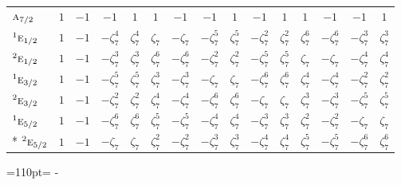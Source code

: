 \documentclass[10pt,a4paper]{article}
\makeatletter
\def\grouprule#1#2{\noalign{\marks\LTgroupmarks{\the\belowrulesep}\nobreak\vskip#1%
  \vskip\aboverulesep}\multispan\LT@cols\unskip{\leaders\hrule\@height#2\hfill\kern\z@}\cr
  \noalign{\penalty\LTrulebreak\vskip\belowrulesep\global\@lastruleclass\z@}}
\newcommand{\needspace}[1]{\par\penalty-100\begingroup\dimen0=#1\relax\dimen2=\pagegoal
  \advance\dimen2-\pagetotal\ifdim\dimen0>\dimen2\relax\ifdim\dimen2>0pt\vfil\break\fi\fi
  \endgroup}
\numberwithin{equation}{section}
\newcommand{\irr}[1]{\text{\normalfont\scshape #1}}
\newcommand{\conjpair}[1]{{}^{#1}}
\newcommand{\rootunity}[1]{\zeta_{#1}}
\makeatother
\begin{document}
{\begin{longtable}{@{}lcccccccccccccc@{}}
\grouprule{0pt}{\lightrulewidth}
$\irr{a}_{7/2}$ & $1$ & $-1$ & $-1$ & $1$ & $1$ & $-1$ & $-1$ & $1$ & $-1$ & $1$ & $1$ & $-1$ & $-1$ & $1$\\
$\conjpair{1}\irr{e}_{1/2}$ & $1$ & $-1$ & $-\rootunity{7}^{4}$ & $\rootunity{7}^{4}$ & $\rootunity{7}$ & $-\rootunity{7}$ & $-\rootunity{7}^{5}$ & $\rootunity{7}^{5}$ & $-\rootunity{7}^{2}$ & $\rootunity{7}^{2}$ & $\rootunity{7}^{6}$ & $-\rootunity{7}^{6}$ & $-\rootunity{7}^{3}$ & $\rootunity{7}^{3}$\\
$\conjpair{2}\irr{e}_{1/2}$ & $1$ & $-1$ & $-\rootunity{7}^{3}$ & $\rootunity{7}^{3}$ & $\rootunity{7}^{6}$ & $-\rootunity{7}^{6}$ & $-\rootunity{7}^{2}$ & $\rootunity{7}^{2}$ & $-\rootunity{7}^{5}$ & $\rootunity{7}^{5}$ & $\rootunity{7}$ & $-\rootunity{7}$ & $-\rootunity{7}^{4}$ & $\rootunity{7}^{4}$\\
$\conjpair{1}\irr{e}_{3/2}$ & $1$ & $-1$ & $-\rootunity{7}^{5}$ & $\rootunity{7}^{5}$ & $\rootunity{7}^{3}$ & $-\rootunity{7}^{3}$ & $-\rootunity{7}$ & $\rootunity{7}$ & $-\rootunity{7}^{6}$ & $\rootunity{7}^{6}$ & $\rootunity{7}^{4}$ & $-\rootunity{7}^{4}$ & $-\rootunity{7}^{2}$ & $\rootunity{7}^{2}$\\
$\conjpair{2}\irr{e}_{3/2}$ & $1$ & $-1$ & $-\rootunity{7}^{2}$ & $\rootunity{7}^{2}$ & $\rootunity{7}^{4}$ & $-\rootunity{7}^{4}$ & $-\rootunity{7}^{6}$ & $\rootunity{7}^{6}$ & $-\rootunity{7}$ & $\rootunity{7}$ & $\rootunity{7}^{3}$ & $-\rootunity{7}^{3}$ & $-\rootunity{7}^{5}$ & $\rootunity{7}^{5}$\\
$\conjpair{1}\irr{e}_{5/2}$ & $1$ & $-1$ & $-\rootunity{7}^{6}$ & $\rootunity{7}^{6}$ & $\rootunity{7}^{5}$ & $-\rootunity{7}^{5}$ & $-\rootunity{7}^{4}$ & $\rootunity{7}^{4}$ & $-\rootunity{7}^{3}$ & $\rootunity{7}^{3}$ & $\rootunity{7}^{2}$ & $-\rootunity{7}^{2}$ & $-\rootunity{7}$ & $\rootunity{7}$\\*
$\conjpair{2}\irr{e}_{5/2}$ & $1$ & $-1$ & $-\rootunity{7}$ & $\rootunity{7}$ & $\rootunity{7}^{2}$ & $-\rootunity{7}^{2}$ & $-\rootunity{7}^{3}$ & $\rootunity{7}^{3}$ & $-\rootunity{7}^{4}$ & $\rootunity{7}^{4}$ & $\rootunity{7}^{5}$ & $-\rootunity{7}^{5}$ & $-\rootunity{7}^{6}$ & $\rootunity{7}^{6}$\\
\bottomrule\end{longtable}}
\needspace{110pt}
\end{document}
